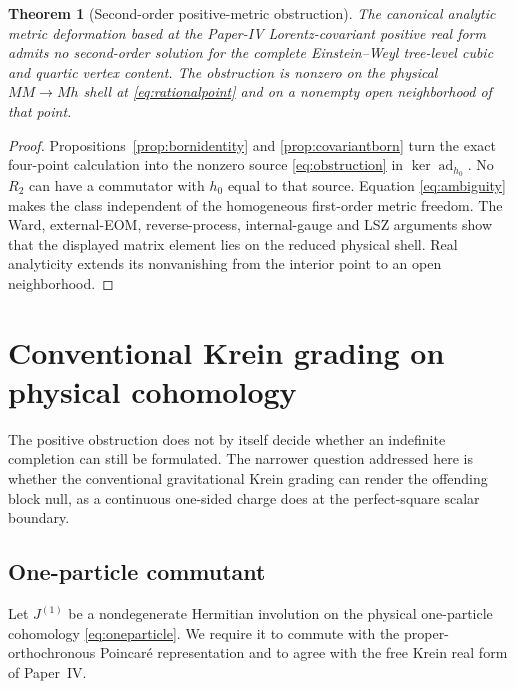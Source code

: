 \documentclass[11pt]{article}
\newtheorem{theorem}{Theorem}[section]
\theoremstyle{definition}
\theoremstyle{remark}
\newcommand{\ad}{\operatorname{ad}}
\begin{document}
\begin{theorem}[Second-order positive-metric obstruction]
\label{thm:positiveobstruction}
The canonical analytic metric deformation based at the Paper-IV
Lorentz-covariant positive real form admits no second-order solution for
the complete Einstein--Weyl tree-level cubic and quartic vertex content.
The obstruction is nonzero on the physical $MM\to Mh$ shell at
\eqref{eq:rationalpoint} and on a nonempty open neighborhood of that
point.
\end{theorem}

\begin{proof}
Propositions~\ref{prop:bornidentity} and \ref{prop:covariantborn} turn
the exact four-point calculation into the nonzero source
\eqref{eq:obstruction} in $\ker\ad_{h_0}$.  No $R_2$ can have a
commutator with $h_0$ equal to that source.  Equation
\eqref{eq:ambiguity} makes the class independent of the homogeneous
first-order metric freedom.  The Ward, external-EOM, reverse-process,
internal-gauge and LSZ arguments show that the displayed matrix element
lies on the reduced physical shell.  Real analyticity extends its
nonvanishing from the interior point to an open neighborhood.
\end{proof}
\section{Conventional Krein grading on physical cohomology}
\label{sec:grading}

The positive obstruction does not by itself decide whether an indefinite
completion can still be formulated.  The narrower question addressed
here is whether the conventional gravitational Krein grading can render
the offending block null, as a continuous one-sided charge does at the
perfect-square scalar boundary.

\subsection{One-particle commutant}

Let $J^{(1)}$ be a nondegenerate Hermitian involution on the physical
one-particle cohomology \eqref{eq:oneparticle}.  We require it to commute
with the proper-orthochronous Poincar\'e representation and to agree with
the free Krein real form of Paper~IV.
\end{document}
